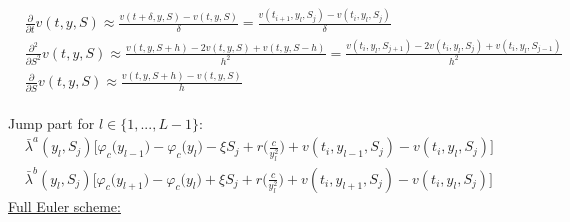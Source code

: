 \documentclass[8pt]{article}
\begin{document}
$\begin{aligned}
&\frac{\partial}{\partial t} v(t, y, S) \approx \frac{v(t + \delta,y,S) - v(t,y,S)}{\delta} = \frac{v(t_{i+1},y_l,S_j) - v(t_{i},y_l,S_j)}{\delta} \\
&\frac{\partial^2}{\partial S^2} v(t, y, S) \approx \frac{v(t,y,S+h) - 2v(t,y,S) + v(t,y,S-h)}{h^2} = \frac{v(t_{i},y_l,S_{j+1}) - 2v(t_{i},y_l,S_j) + v(t_{i},y_l,S_{j-1})}{h^2} \\
&\frac{\partial}{\partial S} v(t,y,S) \approx \frac{v(t,y,S+h) - v(t,y,S)}{h}
\end{aligned}$\\ \\

Jump part for $l \in \{1,...,L-1\}$:\\

$\begin{aligned}
&\bar{\lambda}^a(y_l, S_j) \big[ \varphi_c \big(y_{l-1} \big) - \varphi_c \big(y_l \big) - \xi S_j + r \big(\frac{c}{y_l^2} \big) + v(t_{i}, y_{l-1}, S_j) - v(t_{i}, y_l, S_j) \big] \\
&\bar{\lambda}^b(y_l, S_j) \big[ \varphi_c \big(y_{l+1} \big) - \varphi_c \big(y_l \big) + \xi S_j + r \big(\frac{c}{y_l^2} \big) + v(t_{i}, y_{l+1}, S_j) - v(t_{i}, y_l, S_j) \big]
\end{aligned}$ \\

\underline{Full Euler scheme:}\\

\\
\end{document}
